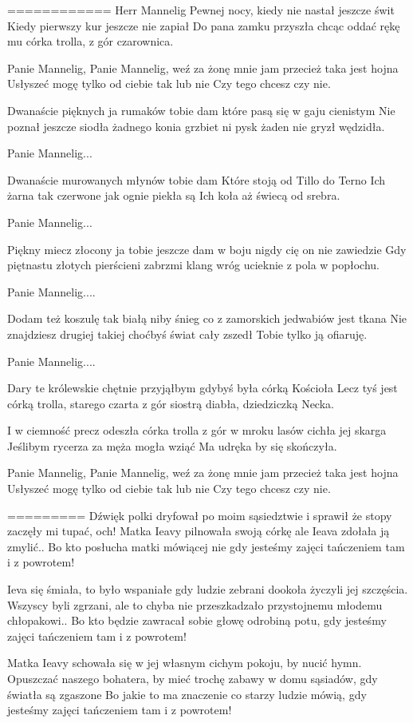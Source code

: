 ============
Herr Mannelig
Pewnej nocy, kiedy nie nastał jeszcze świt
Kiedy pierwszy kur jeszcze nie zapiał
Do pana zamku przyszła chcąc oddać rękę mu
córka trolla, z gór czarownica.

Panie Mannelig, Panie Mannelig, weź za żonę mnie
jam przecież taka jest hojna
Usłyszeć mogę tylko od ciebie tak lub nie
Czy tego chcesz czy nie.

Dwanaście pięknych ja rumaków tobie dam
które pasą się w gaju cienistym
Nie poznał jeszcze siodła żadnego konia grzbiet
ni pysk żaden nie gryzł wędzidła.

Panie Mannelig...

Dwanaście murowanych młynów tobie dam
Które stoją od Tillo do Terno
Ich żarna tak czerwone jak ognie piekła są
Ich koła aż świecą od srebra.

Panie Mannelig...

Piękny miecz złocony ja tobie jeszcze dam
w boju nigdy cię on nie zawiedzie
Gdy piętnastu złotych pierścieni zabrzmi klang
wróg ucieknie z pola w popłochu.

Panie Mannelig....

Dodam też koszulę tak białą niby śnieg
co z zamorskich jedwabiów jest tkana
Nie znajdziesz drugiej takiej choćbyś świat cały zszedł
Tobie tylko ją ofiaruję.

Panie Mannelig....

Dary te królewskie chętnie przyjąłbym
gdybyś była córką Kościoła
Lecz tyś jest córką trolla, starego czarta z gór
siostrą diabła, dziedziczką Necka.

I w ciemność precz odeszła córka trolla z gór
w mroku lasów cichła jej skarga
Jeślibym rycerza za męża mogła wziąć
Ma udręka by się skończyła.

Panie Mannelig, Panie Mannelig, weź za żonę mnie
jam przecież taka jest hojna
Usłyszeć mogę tylko od ciebie tak lub nie
Czy tego chcesz czy nie.

=========
Dźwięk polki dryfował po moim sąsiedztwie
i sprawił że stopy zaczęły mi tupać, och!
Matka Ieavy pilnowała swoją córkę ale
Ieava zdołała ją zmylić..
Bo kto posłucha matki mówiącej nie
gdy jesteśmy zajęci tańczeniem tam i z powrotem!

Ieva się śmiała, to było wspaniałe
gdy ludzie zebrani dookoła życzyli jej szczęścia.
Wszyscy byli zgrzani, ale to chyba nie przeszkadzało
przystojnemu młodemu chłopakowi..
Bo kto będzie zawracał sobie głowę odrobiną potu,
gdy jesteśmy zajęci tańczeniem tam i z powrotem!

Matka Ieavy schowała się
w jej własnym cichym pokoju, by nucić hymn.
Opuszczać naszego bohatera, by mieć trochę zabawy
w domu sąsiadów, gdy światła są zgaszone
Bo jakie to ma znaczenie co starzy ludzie mówią,
gdy jesteśmy zajęci tańczeniem tam i z powrotem!

